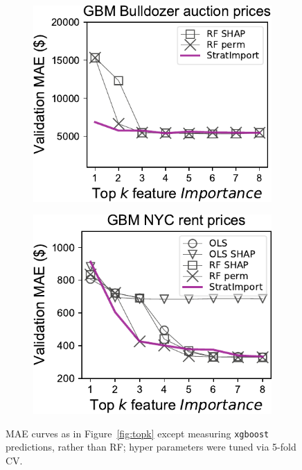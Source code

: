 \documentclass[11pt]{article}
\newcommand{\figref}[1]{Figure~\ref{#1}}
\begin{document}
\begin{figure}
\begin{subfigure}{.245\textwidth}
\vspace{-7mm}
\subcaption{}
\end{subfigure}
\hfill
\begin{subfigure}{.245\textwidth}
    \centering
\includegraphics[scale=0.45]{images/bulldozer-topk-GBM-Importance.pdf}
\vspace{-7mm}
\subcaption{}
\end{subfigure}%
\hfill
\begin{subfigure}{.245\textwidth}
    \centering
\includegraphics[scale=0.45]{images/rent-topk-GBM-Importance.pdf}
\vspace{-7mm}
\subcaption{}
\end{subfigure}
\vspace{-3mm}
\caption[short]{\small MAE curves as in \figref{fig:topk} except measuring {\tt xgboost} predictions, rather than RF; hyper parameters were tuned via 5-fold CV.}
\label{fig:topk-gbm}
\end{figure}
\end{document}
